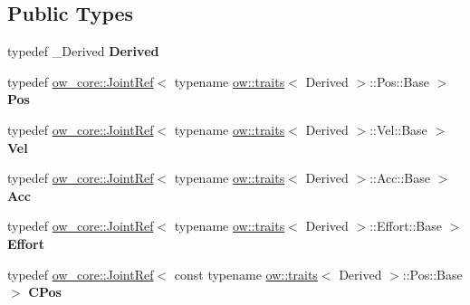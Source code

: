 \subsection*{Public Types}
\begin{DoxyCompactItemize}
\item 
typedef \+\_\+\+Derived {\bfseries Derived}\hypertarget{classow__core_1_1JointStateRef_a2e39aa2780a1e5a72603635cc3636d32}{}\label{classow__core_1_1JointStateRef_a2e39aa2780a1e5a72603635cc3636d32}

\item 
typedef \hyperlink{classow__core_1_1JointRef}{ow\+\_\+core\+::\+Joint\+Ref}$<$ typename \hyperlink{structow_1_1traits}{ow\+::traits}$<$ Derived $>$\+::Pos\+::\+Base $>$ {\bfseries Pos}\hypertarget{classow__core_1_1JointStateRef_a24bc45afcdfb9a8c01a631e4d93f81ca}{}\label{classow__core_1_1JointStateRef_a24bc45afcdfb9a8c01a631e4d93f81ca}

\item 
typedef \hyperlink{classow__core_1_1JointRef}{ow\+\_\+core\+::\+Joint\+Ref}$<$ typename \hyperlink{structow_1_1traits}{ow\+::traits}$<$ Derived $>$\+::Vel\+::\+Base $>$ {\bfseries Vel}\hypertarget{classow__core_1_1JointStateRef_afa2be2f64bccba1aea2f8c18136c6e08}{}\label{classow__core_1_1JointStateRef_afa2be2f64bccba1aea2f8c18136c6e08}

\item 
typedef \hyperlink{classow__core_1_1JointRef}{ow\+\_\+core\+::\+Joint\+Ref}$<$ typename \hyperlink{structow_1_1traits}{ow\+::traits}$<$ Derived $>$\+::Acc\+::\+Base $>$ {\bfseries Acc}\hypertarget{classow__core_1_1JointStateRef_a3641305cc4dc1ccf9c9d29e278a162a5}{}\label{classow__core_1_1JointStateRef_a3641305cc4dc1ccf9c9d29e278a162a5}

\item 
typedef \hyperlink{classow__core_1_1JointRef}{ow\+\_\+core\+::\+Joint\+Ref}$<$ typename \hyperlink{structow_1_1traits}{ow\+::traits}$<$ Derived $>$\+::Effort\+::\+Base $>$ {\bfseries Effort}\hypertarget{classow__core_1_1JointStateRef_a89eb97afb2d257d22adeca16044095be}{}\label{classow__core_1_1JointStateRef_a89eb97afb2d257d22adeca16044095be}

\item 
typedef \hyperlink{classow__core_1_1JointRef}{ow\+\_\+core\+::\+Joint\+Ref}$<$ const typename \hyperlink{structow_1_1traits}{ow\+::traits}$<$ Derived $>$\+::Pos\+::\+Base $>$ {\bfseries C\+Pos}\hypertarget{classow__core_1_1JointStateRef_ade2c38afd0054cba35c50055155b3118}{}\label{classow__core_1_1JointStateRef_ade2c38afd0054cba35c50055155b3118}


\end{DoxyCompactItemize}

